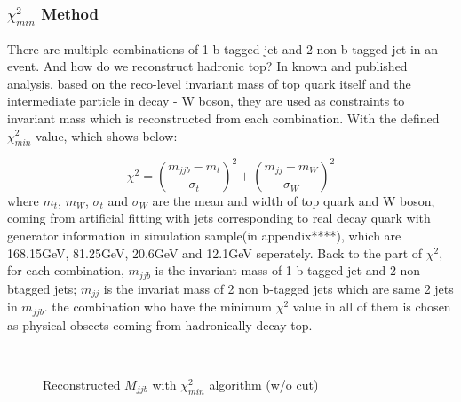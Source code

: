 		\subsubsection{$\chi^2_{min}$ Method}
		\label{sssec:minchi2_intro} 

			There are multiple combinations of 1 b-tagged jet and 2 non b-tagged jet in an event. And how do we reconstruct hadronic top? In known and published analysis, based on the reco-level invariant mass of top quark itself and the intermediate particle in decay - W boson, they are used as constraints to invariant mass which is reconstructed from each combination. With the defined $\chi^2_{min}$ value, which shows below:

			\begin{equation}
			\chi^2 = (\frac{m_{jjb}-m_{t}}{\sigma_{t}})^2 + (\frac{m_{jj}-m_{W}}{\sigma_{W}})^2
			\label{eq:chi2}
			\end{equation}
			where $m_{t}$, $m_{W}$, $\sigma_{t}$ and $\sigma_{W}$ are the mean and width of top quark and W boson, coming from artificial fitting with jets corresponding to real decay quark with generator information in simulation sample(in appendix****), which are 168.15GeV, 81.25GeV, 20.6GeV and 12.1GeV seperately. Back to the part of $\chi^2$, for each combination, $m_{jjb}$ is the invariant mass of 1 b-tagged jet and 2 non-btagged jets; $m_{jj}$ is the invariat mass of 2 non b-tagged jets which are same 2 jets in $m_{jjb}$. the combination who have the minimum ${\chi}^{2}$ value in all of them is chosen as physical obsects coming from hadronically decay top.


\begin{figure}[H]
\centering
    \\
\caption{Reconstructed $M_{jjb}$ with $\chi^2_{min}$ algorithm (w/o cut)}
\label{EventSelReco:fig:chi2_SR_NC_Mjjb}
\end{figure}
\FloatBarrier

